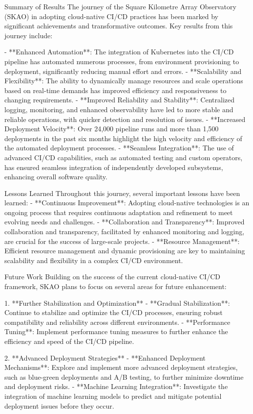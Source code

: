 \documentclass[a4paper]{spie}  %
\begin{document}
 Summary of Results
The journey of the Square Kilometre Array Observatory (SKAO) in adopting cloud-native CI/CD practices has been marked by significant achievements and transformative outcomes. Key results from this journey include:

- **Enhanced Automation**: The integration of Kubernetes into the CI/CD pipeline has automated numerous processes, from environment provisioning to deployment, significantly reducing manual effort and errors.
- **Scalability and Flexibility**: The ability to dynamically manage resources and scale operations based on real-time demands has improved efficiency and responsiveness to changing requirements.
- **Improved Reliability and Stability**: Centralized logging, monitoring, and enhanced observability have led to more stable and reliable operations, with quicker detection and resolution of issues.
- **Increased Deployment Velocity**: Over 24,000 pipeline runs and more than 1,500 deployments in the past six months highlight the high velocity and efficiency of the automated deployment processes.
- **Seamless Integration**: The use of advanced CI/CD capabilities, such as automated testing and custom operators, has ensured seamless integration of independently developed subsystems, enhancing overall software quality.

 Lessons Learned
Throughout this journey, several important lessons have been learned:
- **Continuous Improvement**: Adopting cloud-native technologies is an ongoing process that requires continuous adaptation and refinement to meet evolving needs and challenges.
- **Collaboration and Transparency**: Improved collaboration and transparency, facilitated by enhanced monitoring and logging, are crucial for the success of large-scale projects.
- **Resource Management**: Efficient resource management and dynamic provisioning are key to maintaining scalability and flexibility in a complex CI/CD environment.

 Future Work
Building on the success of the current cloud-native CI/CD framework, SKAO plans to focus on several areas for future enhancement:

1. **Further Stabilization and Optimization**
   - **Gradual Stabilization**: Continue to stabilize and optimize the CI/CD processes, ensuring robust compatibility and reliability across different environments.
   - **Performance Tuning**: Implement performance tuning measures to further enhance the efficiency and speed of the CI/CD pipeline.

2. **Advanced Deployment Strategies**
   - **Enhanced Deployment Mechanisms**: Explore and implement more advanced deployment strategies, such as blue-green deployments and A/B testing, to further minimize downtime and deployment risks.
   - **Machine Learning Integration**: Investigate the integration of machine learning models to predict and mitigate potential deployment issues before they occur.
\end{document}
